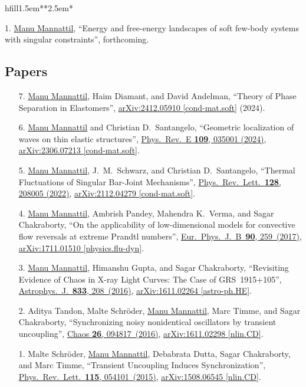 \documentclass[10pt,a4paper,article,oneside]{memoir}
\def\bname{\underline{Manu Mannattil}}    %
\def\doi#1#2{\href{https://doi.org/#1}{#2}}
\def\arxiv#1#2{\href{https://arxiv.org/abs/#1}{arXiv:#1 [#2]}}
\begin{document}
\begin{flexlabelled}{hfill}{1.5em}{*}{*}{2.5em}{*}
  \setlength{\itemsep}{-0.25em}
  \item[1.] {\bname}, ``Energy and free-energy landscapes of soft few-body systems with singular constraints'', forthcoming.
\end{flexlabelled}



\subsection{Papers}

\begin{enumerate}
  \item[7.] {\bname}, Haim Diamant, and David Andelman, ``Theory of Phase Separation in Elastomers'', \arxiv{2412.05910}{cond-mat.soft} (2024).
  \item[6.] {\bname} and Christian D.~Santangelo, ``Geometric localization of waves on thin elastic structures'', \doi{10.1103/PhysRevE.109.035001}{Phys.~Rev.~E \textbf{109}, 035001 (2024)}, \arxiv{2306.07213}{cond-mat.soft}.
  \item[5.] \bname, J.~M.~Schwarz, and Christian D.~Santangelo, ``Thermal Fluctuations of Singular Bar-Joint Mechanisms'', \doi{10.1103/PhysRevLett.128.208005}{Phys.~Rev.~Lett.~\textbf{128}, 208005 (2022)}, \arxiv{2112.04279}{cond-mat.soft}.
  \item[4.] \bname, Ambrish Pandey, Mahendra K.~Verma, and Sagar Chakraborty, ``On the applicability of low-dimensional models for convective flow reversals at extreme Prandtl numbers'', \doi{10.1140/epjb/e2017-80391-1}{Eur.~Phys.~J.~B~\textbf{90}, 259~(2017)}, \arxiv{1711.01510}{physics.flu-dyn}.
  \item[3.] \bname, Himanshu Gupta, and Sagar Chakraborty, ``Revisiting Evidence of Chaos in X-ray Light Curves: The Case of GRS~1915+105'', \doi{10.3847/1538-4357/833/2/208}{Astrophys.~J.~\textbf{833}, 208~(2016)}, \arxiv{1611.02264}{astro-ph.HE}.
  \item[2.] Aditya Tandon, Malte Schr\"{o}der, \bname, Marc Timme, and Sagar Chakraborty, ``Synchronizing noisy nonidentical oscillators by transient uncoupling'', \doi{10.1063/1.4959141}{Chaos \textbf{26}, 094817~(2016)}, \arxiv{1611.02298}{nlin.CD}.
  \item[1.] Malte Schr\"{o}der, \bname, Debabrata Dutta, Sagar Chakraborty, and Marc Timme, ``Transient Uncoupling Induces Synchronization'', \doi{10.1103/PhysRevLett.115.054101}{Phys.~Rev.~Lett.~\textbf{115}, 054101~(2015)}, \arxiv{1508.06545}{nlin.CD}.
\end{enumerate}
\end{document}
